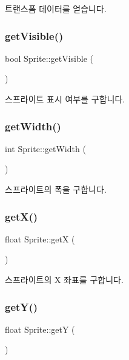 트랜스폼 데이터를 얻습니다. \mbox{\label{class_sprite_a0dccd1488bcdba09fc67d1d4bb19298f}} 
\subsubsection{\texorpdfstring{getVisible()}{getVisible()}}
{\footnotesize\ttfamily bool Sprite\+::get\+Visible (\begin{DoxyParamCaption}{ }\end{DoxyParamCaption})}

스프라이트 표시 여부를 구합니다. \mbox{\label{class_sprite_aba3d4752461ec679fbf5de7ec4c34f61}} 
\subsubsection{\texorpdfstring{getWidth()}{getWidth()}}
{\footnotesize\ttfamily int Sprite\+::get\+Width (\begin{DoxyParamCaption}{ }\end{DoxyParamCaption})}

스프라이트의 폭을 구합니다. \mbox{\label{class_sprite_a566efc9772b4e9a983d3db71b2e5e34e}} 
\subsubsection{\texorpdfstring{getX()}{getX()}}
{\footnotesize\ttfamily float Sprite\+::getX (\begin{DoxyParamCaption}{ }\end{DoxyParamCaption})}

스프라이트의 X 좌표를 구합니다. \mbox{\label{class_sprite_a3bb08547e9d46ab58e05aec774b26ee4}} 
\subsubsection{\texorpdfstring{getY()}{getY()}}
{\footnotesize\ttfamily float Sprite\+::getY (\begin{DoxyParamCaption}{ }\end{DoxyParamCaption})}


